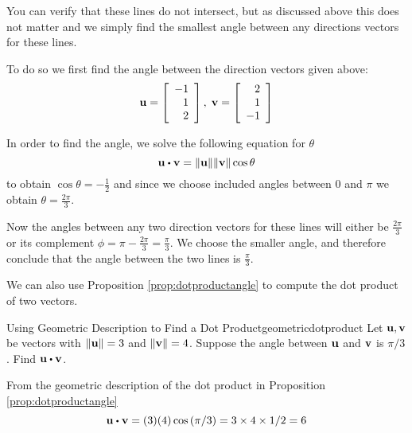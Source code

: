 \begin{solution}
You can verify that these lines do not intersect, but as discussed
above this does not matter and we simply find the smallest angle
between any directions vectors for these lines.

To do so  we first find the angle
between the direction vectors given above:
\begin{equation*}
{\bf u}=\left[
\begin{array}{r}
-1 \\
1 \\
2
\end{array}
\right],\;
{\bf v}=\left[
\begin{array}{r}
2 \\
1 \\
-1
\end{array}
\right]
\end{equation*}

In order to find the angle, we solve the following equation for $\theta$
\begin{equation*}
\vect{u}\dotprod \vect{v}=\vectlength \vect{u}\vectlength \vectlength \vect{v}
\vectlength \cos \theta
\end{equation*}
to obtain $\cos \theta = -\frac{1}{2}$ and since we choose included
angles between $0$ and $\pi$ we obtain $\theta = \frac{2 \pi}{3}$.


Now the angles between any two direction vectors for these lines will
either be $\frac{2 \pi}{3}$ or its complement $ \phi = \pi -  \frac{2 \pi}{3}
= \frac{\pi}{3}$. We choose the smaller angle, and therefore conclude that the angle between the two lines is $\frac{\pi}{3}$.
\end{solution}

We can also use Proposition \ref{prop:dotproductangle} to compute the dot product of two vectors.

\begin{example}{Using Geometric Description to Find a Dot Product}{geometricdotproduct}
Let ${\bf u},{\bf v}$ be vectors with $ \| {\bf u} \| = 3$ and $\| {\bf v} \| = 4$. 
Suppose the angle between ${\bf u}$ and ${\bf v}$ is $\pi / 3$. Find $\vect{u}\dotprod \vect{v}$.
\end{example}

\begin{solution}
From the geometric description of the dot product in Proposition \ref{prop:dotproductangle}
\begin{equation*}
\vect{u}\dotprod \vect{v}=(3)(4) \cos \left( \pi / 3\right) =3\times
4\times 1/2=6
\end{equation*}
\end{solution}

